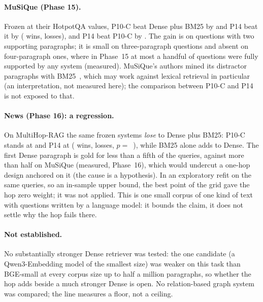 \paragraph{MuSiQue (Phase 15).} Frozen at their HotpotQA values, P10-C beat Dense plus BM25 by
\deltaPhFifteenTenCvsB\pp{} and P14 beat it by \deltaPhFifteenPFourteen\pp{} (\winsPhFifteenPFourteen{} wins,
\lossesPhFifteenPFourteen{} losses), and P14 beat P10-C by \deltaPhFifteenFourteenvsC\pp. The gain is on
questions with two supporting paragraphs; it is small on three-paragraph questions and absent on
four-paragraph ones, where in Phase~15 at most a handful of questions were fully supported by any system (measured).
MuSiQue's authors mined its distractor paragraphs with BM25~\citep{trivedi2022musique}, which may work against
lexical retrieval in particular (an interpretation, not measured here); the comparison between P10-C
and P14 is not exposed to that.

\paragraph{News (Phase 16): a regression.} On MultiHop-RAG the same frozen systems \emph{lose}
to Dense plus BM25: P10-C stands at \deltaPhSixteenTenCvsB\pp{} and P14 at \deltaPhSixteenPFourteen\pp{}
(\winsPhSixteenPFourteen{} wins, \lossesPhSixteenPFourteen{} losses, $p=$~\pPhSixteenPFourteen{}), while BM25 alone adds \deltaPhSixteenBvsA\pp{}
to Dense. The first Dense paragraph is gold for less than a fifth of the queries, against more than half on
MuSiQue (measured, Phase~16), which would undercut a one-hop design anchored on it (the cause is a hypothesis).
In an exploratory refit on the same queries, so an in-sample upper bound, the best point of the grid gave the
hop zero weight; it was not applied. This is one small corpus of one kind of text with questions written by a language
model: it bounds the claim, it does not settle why the hop fails there.

\begin{table}[t]
\centering
\small
\caption{\capLadder}
\label{tab:ladder}
\end{table}

\paragraph{Not established.} No substantially stronger Dense retriever was tested: the one
candidate (a Qwen3-Embedding model of the smallest size) was weaker on this task than BGE-small at every corpus size up
to half a million paragraphs, so whether the hop adds beside a much stronger Dense is open. No
relation-based graph system was compared; the line measures a floor, not a ceiling.

\begin{table}[t]
\centering
\small
\caption{\capEarlierComparisons}
\label{tab:earlier}

\end{table}
